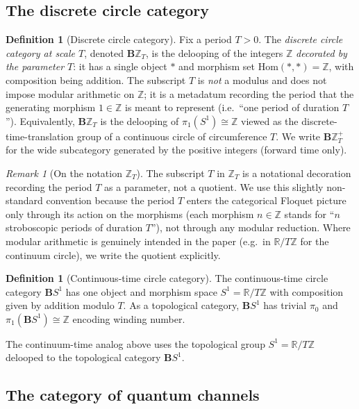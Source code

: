 \documentclass[12pt]{article}
\theoremstyle{definition}
\newtheorem{definition}[theorem]{Definition}
\theoremstyle{remark}
\newtheorem{remark}[theorem]{Remark}
\newcommand{\Z}{\mathbb{Z}}
\newcommand{\R}{\mathbb{R}}
\begin{document}
\subsection{The discrete circle category}

\begin{definition}[Discrete circle category]
\label{def:circle-cat}
Fix a period $T>0$. The \emph{discrete circle category at scale $T$}, denoted $\mathbf{B}\Z_T$, is the delooping of the integers $\Z$ \emph{decorated by the parameter $T$}: it has a single object $*$ and morphism set $\mathrm{Hom}(*,*) = \Z$, with composition being addition. The subscript $T$ is \emph{not} a modulus and does not impose modular arithmetic on $\Z$; it is a metadatum recording the period that the generating morphism $1\in\Z$ is meant to represent (i.e.\ ``one period of duration $T$''). Equivalently, $\mathbf{B}\Z_T$ is the delooping of $\pi_1(S^1)\cong\Z$ viewed as the discrete-time-translation group of a continuous circle of circumference $T$. We write $\mathbf{B}\Z_T^+$ for the wide subcategory generated by the positive integers (forward time only).
\end{definition}

\begin{remark}[On the notation $\Z_T$]
\label{rem:zt-notation}
The subscript $T$ in $\Z_T$ is a notational decoration recording the period $T$ as a parameter, not a quotient. We use this slightly non-standard convention because the period $T$ enters the categorical Floquet picture only through its action on the morphisms (each morphism $n\in\Z$ stands for ``$n$ stroboscopic periods of duration $T$''), not through any modular reduction. Where modular arithmetic is genuinely intended in the paper (e.g.\ in $\R/T\Z$ for the continuum circle), we write the quotient explicitly.
\end{remark}

\begin{definition}[Continuous-time circle category]
\label{def:cts-circle}
The continuous-time circle category $\mathbf{B}S^1$ has one object and morphism space $S^1=\R/T\Z$ with composition given by addition modulo $T$. As a topological category, $\mathbf{B}S^1$ has trivial $\pi_0$ and $\pi_1(\mathbf{B}S^1)\cong\Z$ encoding winding number.
\end{definition}

The continuum-time analog above uses the topological group $S^1=\R/T\Z$ delooped to the topological category $\mathbf{B}S^1$.

\subsection{The category of quantum channels}
\end{document}
